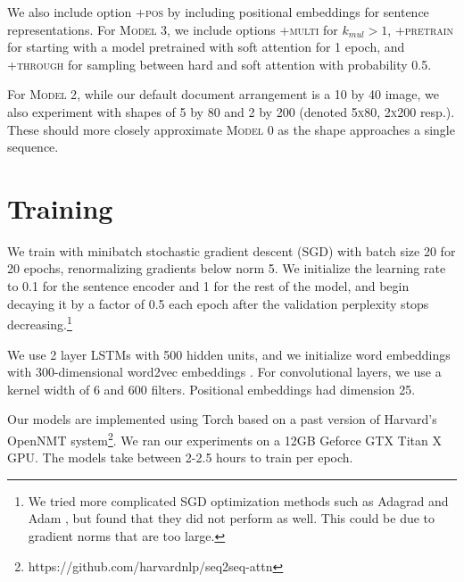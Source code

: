 \documentclass[12pt]{report}
\begin{document}
We also include option \textsc{+pos} by including positional embeddings for sentence representations. For \textsc{Model 3}, we include options \textsc{+multi} for $k_{mul} > 1$, \textsc{+pretrain} for starting with a model pretrained with soft attention for 1 epoch, and \textsc{+through} for sampling between hard and soft attention with probability 0.5.

For \textsc{Model 2}, while our default document arrangement is a 10 by 40 image, we also experiment with shapes of 5 by 80 and 2 by 200 (denoted \textsc{5x80}, \textsc{2x200} resp.). These should more closely approximate \textsc{Model 0} as the shape approaches a single sequence.


\section{Training}

We train with minibatch stochastic gradient descent (SGD) with batch size 20 for 20 epochs, renormalizing gradients below norm 5. We initialize the learning rate to 0.1 for the sentence encoder and 1 for the rest of the model, and begin decaying it by a factor of 0.5 each epoch after the validation perplexity stops decreasing.\footnote{We tried more complicated SGD optimization methods such as Adagrad \citep{Duchi2011} and Adam \citep{Kingma2015}, but found that they did not perform as well. This could be due to gradient norms that are too large.}

We use 2 layer LSTMs with 500 hidden units, and we initialize word embeddings with 300-dimensional word2vec embeddings \citep{mikolov2013word2vec}. For convolutional layers, we use a kernel width of 6 and 600 filters. Positional embeddings had dimension 25.





Our models are implemented using Torch \citep{Torch} based on a past version of Harvard's OpenNMT system\footnote{https://github.com/harvardnlp/seq2seq-attn}. We ran our experiments on a 12GB Geforce GTX Titan X GPU.
The models take between 2-2.5 hours to train per epoch.
\end{document}
